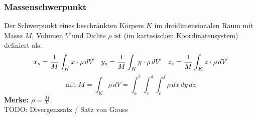 \subsubsection{Massenschwerpunkt}
Der Schwerpunkt eines beschränkten Körpers $K$ im dreidimensionalen Raum mit Masse $M$, Volumen $V$ und Dichte $\rho$ ist (im kartesischen Koordinatensystem) definiert als:
\[
	x_s = \frac{1}{M} \int_K x \cdot \rho \, dV \hspace{10pt} 
	y_s = \frac{1}{M} \int_K y \cdot \rho \, dV \hspace{10pt} 
	z_s = \frac{1}{M} \int_K z \cdot \rho \, dV
\]
\[
	\text{mit } M = \int_K \rho \, dV = \int_a^b \int_c^d \int_e^f \rho \, dx \, dy \, dz
\]
\textbf{Merke:} $\rho = \frac{M}{V}$\\
TODO:  Divergenzsatz / Satz von Gauss
\newpage